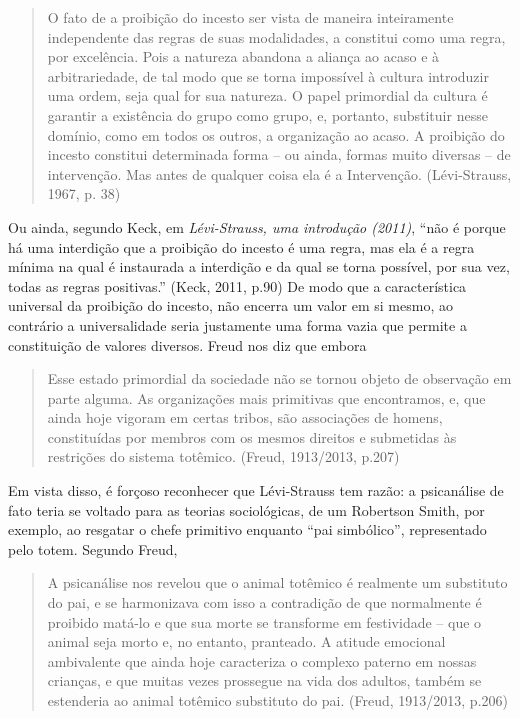 \begin{quote}
O fato de a proibição do incesto ser vista de maneira inteiramente
independente das regras de suas modalidades, a constitui como uma regra,
por excelência. Pois a natureza abandona a aliança ao acaso e à
arbitrariedade, de tal modo que se torna impossível à cultura introduzir
uma ordem, seja qual for sua natureza. O papel primordial da cultura é
garantir a existência do grupo como grupo, e, portanto, substituir nesse
domínio, como em todos os outros, a organização ao acaso. A proibição do
incesto constitui determinada forma -- ou ainda, formas muito diversas
-- de intervenção. Mas antes de qualquer coisa ela é a Intervenção.
(Lévi-Strauss, 1967, p. 38)
\end{quote}

Ou ainda, segundo Keck, em \emph{Lévi-Strauss, uma introdução (2011)},
``não é porque há uma interdição que a proibição do incesto é uma regra,
mas ela é a regra mínima na qual é instaurada a interdição e da qual se
torna possível, por sua vez, todas as regras positivas.'' (Keck, 2011,
p.90) De modo que a característica universal da proibição do incesto,
não encerra um valor em si mesmo, ao contrário a universalidade seria
justamente uma forma vazia que permite a constituição de valores
diversos. Freud nos diz que embora

\begin{quote}
Esse estado primordial da sociedade não se tornou objeto de observação
em parte alguma. As organizações mais primitivas que encontramos, e, que
ainda hoje vigoram em certas tribos, são associações de homens,
constituídas por membros com os mesmos direitos e submetidas às
restrições do sistema totêmico. (Freud, 1913/2013, p.207)
\end{quote}

Em vista disso, é forçoso reconhecer que Lévi-Strauss tem razão: a
psicanálise de fato teria se voltado para as teorias sociológicas, de um
Robertson Smith, por exemplo, ao resgatar o chefe primitivo enquanto
``pai simbólico'', representado pelo totem. Segundo Freud,

\begin{quote}
A psicanálise nos revelou que o animal totêmico é realmente um
substituto do pai, e se harmonizava com isso a contradição de que
normalmente é proibido matá-lo e que sua morte se transforme em
festividade -- que o animal seja morto e, no entanto, pranteado. A
atitude emocional ambivalente que ainda hoje caracteriza o complexo
paterno em nossas crianças, e que muitas vezes prossegue na vida dos
adultos, também se estenderia ao animal totêmico substituto do pai.
(Freud, 1913/2013, p.206)
\end{quote}

